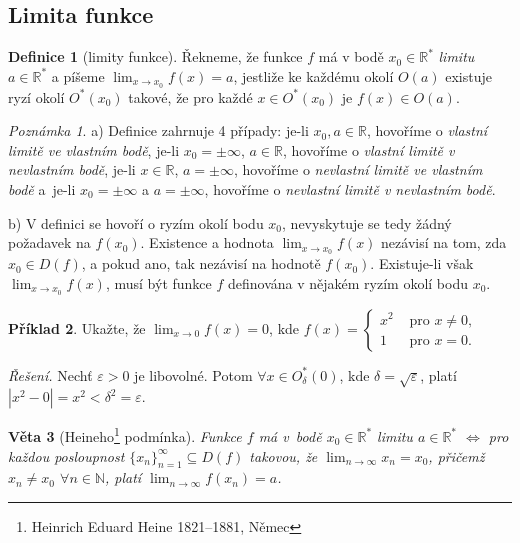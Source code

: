 \documentclass[a4paper,12pt,twoside]{article}
\newtheorem{veta}{Věta}[section]
\theoremstyle{definition}
\newtheorem{defin}[veta]{Definice}
\newtheorem{prikl}[veta]{Příklad}
\theoremstyle{remark}
\newtheorem*{pozn}{Poznámka}
\numberwithin{equation}{section}
\numberwithin{table}{section}
\numberwithin{figure}{section}
\newcommand{\ep}{\varepsilon}
\newcommand{\R}{\mathbb{R}}
\newcommand{\N}{\mathbb{N}}
\begin{document}
\subsection{Limita funkce}
\begin{defin}[limity funkce]
Řekneme, že funkce $f$ má v bodě $x_0\in\R^\ast$ \textit{limitu} $a\in\R^\ast$ a píšeme $\lim_{x\to x_0}
f(x)=a$, jestliže ke každému okolí $O(a)$ existuje ryzí okolí $O^\ast(x_0)$ takové, že pro každé $x\in O^\ast(x_0)$ je $f(x)\in O(a)$.
\end{defin}
\begin{pozn}
a) Definice zahrnuje 4 případy: je-li $x_0,a\in\R$, hovoříme o \textit{vlastní limitě ve vlastním bodě}, je-li 
$x_0=\pm\infty$, $a\in\R$, hovoříme o \textit{vlastní limitě v nevlastním bodě}, je-li $x\in\R$, $a=\pm\infty$, hovoříme o \textit{nevlastní limitě ve vlastním bodě} a~je-li $x_0=\pm\infty$ a $a=\pm\infty$, hovoříme o \textit{nevlastní limitě v nevlastním bodě}. 

b) V definici se hovoří o ryzím okolí bodu $x_0$, nevyskytuje se tedy žádný požadavek na $f(x_0)$. 
Existence a hodnota $\lim_{x\to x_0}f(x)$ nezávisí na tom,
zda $x_0\in D(f)$, a pokud ano, tak nezávisí na hodnotě $f(x_0)$.
Existuje-li však $\lim_{x\to x_0}f(x)$, musí být funkce $f$ definována v nějakém ryzím okolí bodu $x_0$.
\end{pozn}
\begin{prikl}
Ukažte, že $\lim_{x\to 0}f(x)=0$, kde $f(x)=\begin{cases}x^2&\text{ pro }x\ne0,\\
1&\text{ pro }x=0.\end{cases}$
\end{prikl}
\noindent
{\it Řešení.}
Nechť $\ep>0$ je libovolné. Potom $\forall x\in O^\ast_\delta(0)$, kde $\delta=\sqrt{\ep}$, platí $|x^2-0|=x^2<\delta^2=\ep$.
\begin{veta}[Heineho\footnote{Heinrich Eduard Heine 1821--1881, Němec} podmínka]\label{v:heine}
Funkce $f$ má v~bodě $x_0\in\R^\ast$ limitu $a\in\R^\ast$ $\Leftrightarrow$ pro každou posloupnost $\{x_n\}_{n=1}^\infty\subseteq D(f)$
takovou, že $\lim_{n\to\infty}x_n=x_0$, přičemž $x_n\ne x_0$ $\forall n\in\N$, platí\/
$\lim_{n\to\infty}f(x_n)=a$.
\end{veta}
\end{document}
